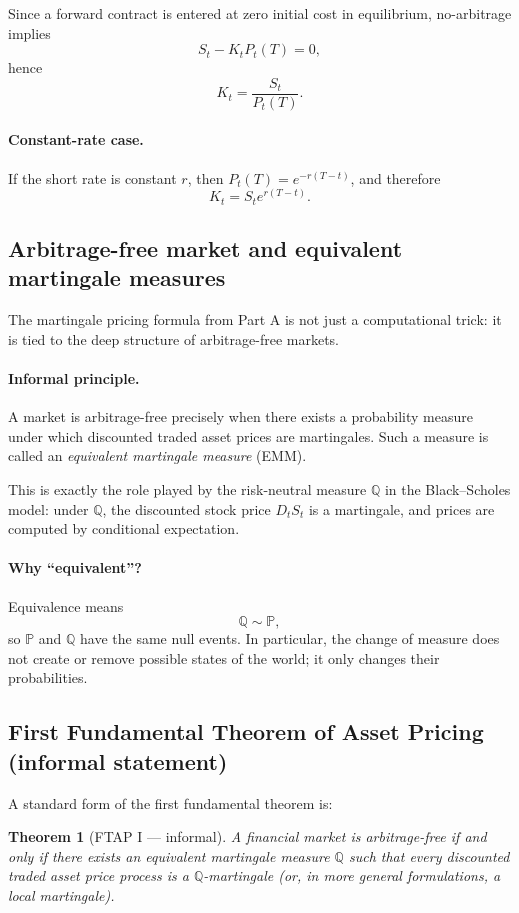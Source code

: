 \documentclass[11pt]{article}
\newcommand{\Pbb}{\mathbb{P}}
\newcommand{\Qbb}{\mathbb{Q}}
\newcommand{\1}{\mathbf{1}}
\newtheorem{theorem}{Theorem}
\begin{document}
Since a forward contract is entered at zero initial cost in equilibrium, no-arbitrage implies
$$
S_t-K_tP_t(T)=0,
$$
hence
$$
\boxed{\ K_t=\frac{S_t}{P_t(T)}. \ }
$$

\paragraph{Constant-rate case.}
If the short rate is constant \(r\), then \(P_t(T)=e^{-r(T-t)}\), and therefore
$$
\boxed{\ K_t=S_t e^{r(T-t)}. \ }
$$

\subsection{Arbitrage-free market and equivalent martingale measures}

The martingale pricing formula from Part A is not just a computational trick:
it is tied to the deep structure of arbitrage-free markets.

\paragraph{Informal principle.}
A market is arbitrage-free precisely when there exists a probability measure under which discounted traded asset prices are martingales.
Such a measure is called an \emph{equivalent martingale measure} (EMM).

This is exactly the role played by the risk-neutral measure \(\Qbb\) in the Black--Scholes model:
under \(\Qbb\), the discounted stock price \(D_tS_t\) is a martingale, and prices are computed by conditional expectation.

\paragraph{Why ``equivalent''?}
Equivalence means
$$
\Qbb \sim \Pbb,
$$
so \(\Pbb\) and \(\Qbb\) have the same null events.
In particular, the change of measure does not create or remove possible states of the world;
it only changes their probabilities.

\subsection{First Fundamental Theorem of Asset Pricing (informal statement)}

A standard form of the first fundamental theorem is:

\begin{theorem}[FTAP I --- informal]
A financial market is arbitrage-free if and only if there exists
an equivalent martingale measure \(\Qbb\) such that every discounted traded asset price process is a \(\Qbb\)-martingale
(or, in more general formulations, a local martingale).
\end{theorem}
\end{document}
